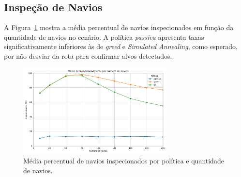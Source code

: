 


\subsection{Inspeção de Navios}

A Figura~\ref{fig:inspecionados} mostra a média percentual de navios inspecionados em função da quantidade de navios no cenário. A política \textit{passiva} apresenta taxas significativamente inferiores às de \textit{greed} e \textit{Simulated Annealing}, como esperado, por não desviar da rota para confirmar alvos detectados.

\begin{figure}[H]
    \centering
    \includegraphics[width=0.7\textwidth]{fig/resultado_ins.png}
    \caption{Média percentual de navios inspecionados por política e quantidade de navios.}
    \label{fig:inspecionados}
\end{figure}

